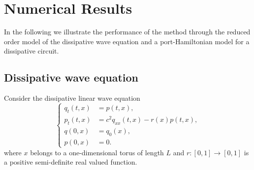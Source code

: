 %






\section{Numerical Results} \label{p3.sec:4}
In the following we illustrate the performance of the method through the reduced order model of the dissipative wave equation and a port-Hamiltonian model for a dissipative circuit.

\subsection{Dissipative wave equation} \label{sec:4.1}

Consider the dissipative linear wave equation
\begin{equation} \label{p3.eq:4.1}
	\left\{
	\begin{aligned}
		q_{t}(t,x) &= p(t,x), \\
		p_{t}(t,x) &= c^2 q_{xx}(t,x) - r(x)  p(t,x) , \\
		q(0,x) &= q_0(x), \\
		p(0,x) &= 0.
	\end{aligned}
	\right.
\end{equation}
where $x$ belongs to a one-dimensional torus of length $L$ and $r:[0,1]\to[0,1]$ is a positive semi-definite real valued function. 

